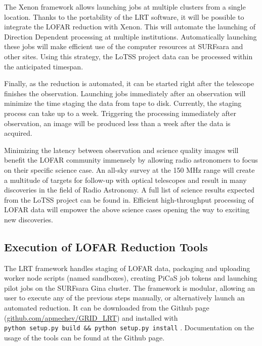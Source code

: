 The Xenon framework\cite{maasen_xenon} allows launching jobs at multiple clusters from a single location. Thanks to the portability of the LRT software, it will be possible to integrate the LOFAR reduction with Xenon. This will automate the launching of Direction Dependent processing at multiple institutions. Automatically launching these jobs will make efficient use of the computer resources at SURFsara and other sites. Using this strategy, the LoTSS project data can be processed within the anticipated timespan. 

Finally, as the reduction is automated, it can be started right after the telescope finishes the observation. Launching jobs immediately after  an observation will minimize the time staging the data from tape to disk. Currently, the staging process can take up to a week. Triggering the processing immediately after observation, an image will be produced less than a week after the data is acquired. 

Minimizing the latency between observation and science quality images will benefit the LOFAR community immensely by allowing radio astronomers to focus on their specific science case. An all-sky survey at the 150 MHz range will create a multitude of targets for follow-up with optical telescopes and result in many discoveries in the field of Radio Astronomy. A full list of science results expected from the LoTSS project can be found in\cite{lotss}. Efficient high-throughput processing of LOFAR data will empower the above science cases opening the way to  exciting new discoveries.


\begin{appendices}

\section{Execution of LOFAR Reduction Tools }\label{sec:appendix_1}

The LRT framework handles staging of LOFAR data, packaging and uploading worker node scripts (named sandboxes), creating PiCaS job tokens and launching pilot jobs on the SURFsara Gina cluster. The framework is modular, allowing an user to execute any of the previous steps manually, or alternatively launch an automated reduction. It can be downloaded from the Github page (\href{https://github.com/apmechev/GRID_LRT}{github.com/apmechev/GRID\_LRT}) and installed with \\
\verb|python setup.py build && python setup.py install| . Documentation on the usage of the tools can be found at the Github page. 
\end{appendices}

